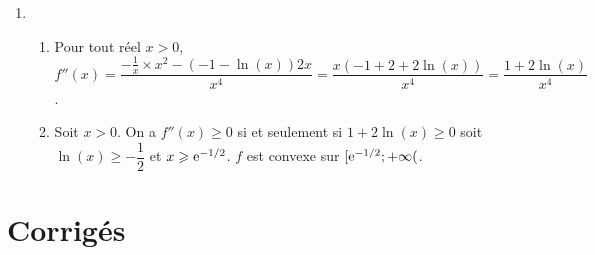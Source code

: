 \documentclass[11pt,fleqn, openany]{book} %
\begin{document}
\begin{solution}
\begin{enumerate}
\item 
\begin{enumerate}
\item Pour tout réel $x>0$, $f''(x)= \dfrac{-\frac{1}{x} \times x^2 -(-1-\ln(x))2x}{x^4}=\dfrac{x(-1+2+2\ln(x))}{x^4}=\dfrac{1+2\ln(x)}{x^4}$.
\item Soit $x>0$. On a $f''(x) \geqslant 0$ si et seulement si $1+2\ln(x) \geqslant 0$ soit $\ln(x)\geqslant -\dfrac{1}{2}$ et $x\geqslant \mathrm{e}^{-1/2}$. $f$ est convexe sur $[\mathrm{e}^{-1/2};+\infty($.
\end{enumerate}
\end{enumerate}

\end{solution}





\chapter{Corrigés}


\printsolutions[headings={false} ]
\end{document}
